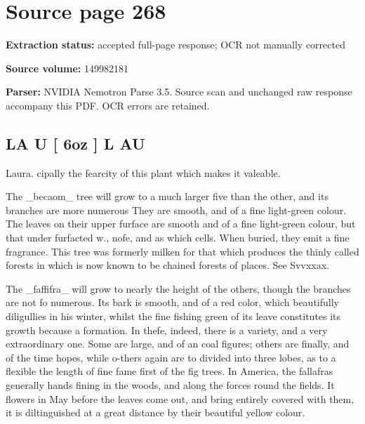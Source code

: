 \clearpage
\section{Source page 268}
\textbf{Extraction status:} accepted full-page response; OCR not manually corrected\par
\textbf{Source volume:} 149982181\par
\textbf{Parser:} NVIDIA Nemotron Parse 3.5. Source scan and unchanged raw response accompany this PDF. OCR errors are retained.\par\medskip
\subsection*{LA U [ 6oz ] L AU}
Laura. cipally the fearcity of this plant which makes it valeable.\par\medskip
The \_becaom\_ tree will grow to a much larger five than the other, and its branches are more numerous They are smooth, and of a fine light-green colour. The leaves on their upper furface are smooth and of a fine light-green colour, but that under furfacted w., nofe, and as which cells. When buried, they emit a fine fragrance. This tree was formerly milken for that which produces the thinly called forests in which is now known to be chained forests of places. See Svvxxax.\par\medskip
The \_faffifra\_ will grow to nearly the height of the others, though the branches are not fo numerous. Its bark is smooth, and of a red color, which beautifully diligullies in his winter, whilst the fine fishing green of its leave constitutes its growth because a formation. In thefe, indeed, there is a variety, and a very extraordinary one. Some are large, and of an coal figures; others are finally, and of the time hopes, while o-thers again are to divided into three lobes, as to a flexible the length of fine fame first of the fig trees. In America, the fallafras generally hands fining in the woods, and along the forces round the fields. It flowers in May before the leaves come out, and bring entirely covered with them, it is diltinguished at a great distance by their beautiful yellow colour.\par\medskip
